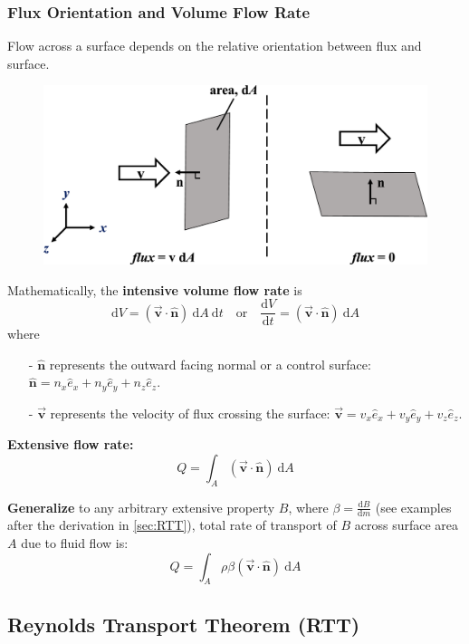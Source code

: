 \documentclass[12pt, a4paper]{article}
\numberwithin{equation}{subsection}
\begin{document}
\subsubsection{Flux Orientation and Volume Flow Rate}
Flow across a surface depends on the relative orientation between flux and surface.
\begin{figure}[H]
    \centering
    \includegraphics[width=.7\textwidth]{img/flux_orientation.eps}
\end{figure}
Mathematically, the \textbf{intensive volume flow rate} is
\[ 
    \mathrm{d}V=(\vec{\bm{v}} \cdot \bm{\hat{n}}) \ \mathrm{d}A \ \mathrm{d}t \quad \text{or} \quad \frac{\mathrm{d}V}{\mathrm{d}t}=(\vec{\bm{v}} \cdot \bm{\hat{n}}) \ \mathrm{d}A 
\]
where
\begin{itemize}
    \item[-] $\bm{\hat{n}}$ represents the outward facing normal or a control surface: $\bm{\hat{n}}=n_{x}\hat{e}_{x}+n_{y}\hat{e}_{y}+n_{z}\hat{e}_{z}$.
    \item[-] $\vec{\bm{v}}$ represents the velocity of flux crossing the surface: $\vec{\bm{v}}=v_{x}\hat{e}_{x}+v_{y}\hat{e}_{y}+v_{z}\hat{e}_{z}$.
\end{itemize}

\textbf{Extensive flow rate:}
\[ 
    Q = \int_{A} (\vec{\bm{v}} \cdot \bm{\hat{n}}) \ \mathrm{d}A 
\]

\textbf{Generalize} to any arbitrary extensive property $B$, where $\beta = \frac{\mathrm{d}B}{\mathrm{d}m}$ (see examples after the derivation in \autoref{sec:RTT}), total rate of transport of $B$ across surface area $A$ due to fluid flow is:
\[
    Q =  \int_{A} \rho \beta (\vec{\bm{v}} \cdot \bm{\hat{n}}) \ \mathrm{d}A 
\]

\subsection{Reynolds Transport Theorem (RTT)}
\label{sec:RTT}
\end{document}
